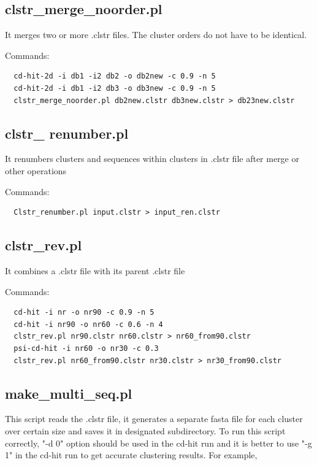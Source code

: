 \documentclass[12pt,a4paper]{article}
\begin{document}
\subsection{clstr\_merge\_noorder.pl }

It merges two or more .clstr files. The cluster orders do not have to be identical.

Commands:

\begin{lstlisting}
  cd-hit-2d -i db1 -i2 db2 -o db2new -c 0.9 -n 5
  cd-hit-2d -i db1 -i2 db3 -o db3new -c 0.9 -n 5
  clstr_merge_noorder.pl db2new.clstr db3new.clstr > db23new.clstr
\end{lstlisting}

\subsection{clstr\_ renumber.pl }

It renumbers clusters and sequences within clusters in .clstr file after merge
or other operations 

Commands:

\begin{lstlisting}
  Clstr_renumber.pl input.clstr > input_ren.clstr
\end{lstlisting}

\subsection{clstr\_rev.pl }

It combines a .clstr file with its parent .clstr file 

Commands:

\begin{lstlisting}
  cd-hit -i nr -o nr90 -c 0.9 -n 5
  cd-hit -i nr90 -o nr60 -c 0.6 -n 4
  clstr_rev.pl nr90.clstr nr60.clstr > nr60_from90.clstr
  psi-cd-hit -i nr60 -o nr30 -c 0.3
  clstr_rev.pl nr60_from90.clstr nr30.clstr > nr30_from90.clstr 
\end{lstlisting}

\subsection{make\_multi\_seq.pl }

This script reads the .clstr file, it generates a separate fasta file for each cluster over certain size and saves it in designated subdirectory. To run this script correctly, "-d 0" option should be used in the cd-hit run and it is better to use "-g 1" in the cd-hit run to get accurate clustering results. For example,
\end{document}
